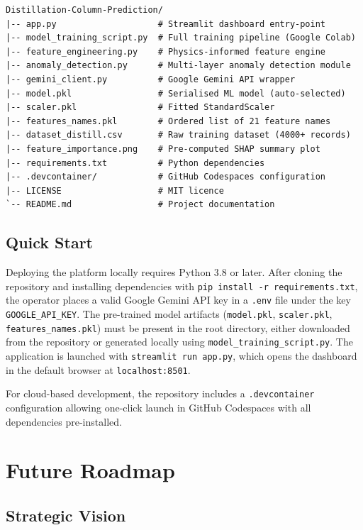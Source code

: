 \documentclass[12pt,a4paper]{report}
\begin{document}
\begin{lstlisting}
Distillation-Column-Prediction/
|-- app.py                    # Streamlit dashboard entry-point
|-- model_training_script.py  # Full training pipeline (Google Colab)
|-- feature_engineering.py    # Physics-informed feature engine
|-- anomaly_detection.py      # Multi-layer anomaly detection module
|-- gemini_client.py          # Google Gemini API wrapper
|-- model.pkl                 # Serialised ML model (auto-selected)
|-- scaler.pkl                # Fitted StandardScaler
|-- features_names.pkl        # Ordered list of 21 feature names
|-- dataset_distill.csv       # Raw training dataset (4000+ records)
|-- feature_importance.png    # Pre-computed SHAP summary plot
|-- requirements.txt          # Python dependencies
|-- .devcontainer/            # GitHub Codespaces configuration
|-- LICENSE                   # MIT licence
`-- README.md                 # Project documentation
\end{lstlisting}

\section{Quick Start}

Deploying the platform locally requires Python 3.8 or later. After cloning the
repository and installing dependencies with \texttt{pip install -r requirements.txt},
the operator places a valid Google Gemini API key in a \texttt{.env} file under the
key \texttt{GOOGLE\_API\_KEY}. The pre-trained model artifacts (\texttt{model.pkl},
\texttt{scaler.pkl}, \texttt{features\_names.pkl}) must be present in the root
directory, either downloaded from the repository or generated locally using
\texttt{model\_training\_script.py}. The application is launched with
\texttt{streamlit run app.py}, which opens the dashboard in the default browser at
\texttt{localhost:8501}.

For cloud-based development, the repository includes a \texttt{.devcontainer}
configuration allowing one-click launch in GitHub Codespaces with all dependencies
pre-installed.

\chapter{Future Roadmap}

\section{Strategic Vision}
\end{document}
